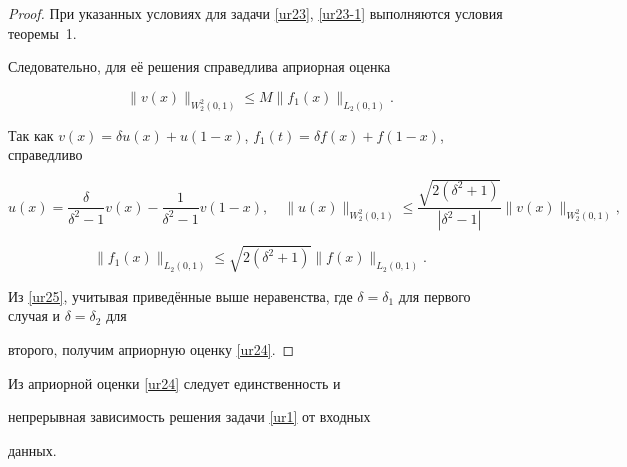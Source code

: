 \smallskip



\begin{proof} При указанных условиях для задачи \eqref{ur23}, \eqref{ur23-1} выполняются условия теоремы~1. 

Следовательно, для её решения справедлива априорная оценка

\begin{equation}

\|v(x)\|_{W_{2}^{2}(0, 1)}\leq M\|f_1(x)\|_{L_2(0, 1)}. \label{ur25}

\end{equation}



Так как $v(x)=\delta u(x)+u(1-x)$, $f_1(t)=\delta f(x)+f(1-x)$, справедливо

$$

u(x)=\frac{\delta}{\delta^2-1}v(x)-\frac{1}{\delta^2-1}v(1-x), \quad

\|u(x)\|_{W_{2}^{2}(0, 1)}\leq\frac{\sqrt{2(\delta^2+1)}}{|\delta^2-1|}\|v(x)\|_{W_{2}^{2}(0, 1)},

$$

$$

\|f_1(x)\|_{L_2(0, 1)}\leq\sqrt{2(\delta^2+1)}\|f(x)\|_{L_2(0, 1)}.

$$



Из \eqref{ur25}, учитывая приведённые выше неравенства, где $\delta=\delta_1$ для первого случая и $\delta=\delta_2$ для

второго, получим априорную оценку \eqref{ur24}.

\end{proof}



\smallskip



Из априорной оценки \eqref{ur24} следует единственность и

непрерывная зависимость решения задачи \eqref{ur1} от входных

данных.











\smallskip





